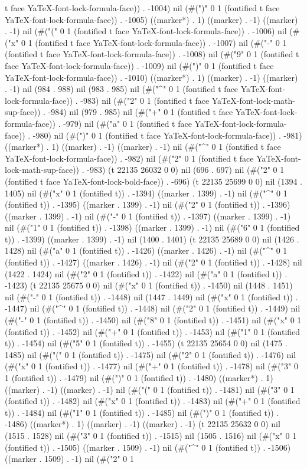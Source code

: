 t face YaTeX-font-lock-formula-face)) . -1004) nil (#(")" 0 1 (fontified t face YaTeX-font-lock-formula-face)) . -1005) ((marker*) . 1) ((marker) . -1) ((marker) . -1) nil (#("(" 0 1 (fontified t face YaTeX-font-lock-formula-face)) . -1006) nil (#("x" 0 1 (fontified t face YaTeX-font-lock-formula-face)) . -1007) nil (#("-" 0 1 (fontified t face YaTeX-font-lock-formula-face)) . -1008) nil (#("9" 0 1 (fontified t face YaTeX-font-lock-formula-face)) . -1009) nil (#(")" 0 1 (fontified t face YaTeX-font-lock-formula-face)) . -1010) ((marker*) . 1) ((marker) . -1) ((marker) . -1) nil (984 . 988) nil (983 . 985) nil (#("^" 0 1 (fontified t face YaTeX-font-lock-formula-face)) . -983) nil (#("2" 0 1 (fontified t face YaTeX-font-lock-math-sup-face)) . -984) nil (979 . 985) nil (#("+" 0 1 (fontified t face YaTeX-font-lock-formula-face)) . -979) nil (#("a" 0 1 (fontified t face YaTeX-font-lock-formula-face)) . -980) nil (#(")" 0 1 (fontified t face YaTeX-font-lock-formula-face)) . -981) ((marker*) . 1) ((marker) . -1) ((marker) . -1) nil (#("^" 0 1 (fontified t face YaTeX-font-lock-formula-face)) . -982) nil (#("2" 0 1 (fontified t face YaTeX-font-lock-math-sup-face)) . -983) (t 22135 26032 0 0) nil (696 . 697) nil (#("2" 0 1 (fontified t face YaTeX-font-lock-bold-face)) . -696) (t 22135 25699 0 0) nil (1394 . 1405) nil (#("x" 0 1 (fontified t)) . -1394) ((marker . 1399) . -1) nil (#("^" 0 1 (fontified t)) . -1395) ((marker . 1399) . -1) nil (#("2" 0 1 (fontified t)) . -1396) ((marker . 1399) . -1) nil (#("-" 0 1 (fontified t)) . -1397) ((marker . 1399) . -1) nil (#("1" 0 1 (fontified t)) . -1398) ((marker . 1399) . -1) nil (#("6" 0 1 (fontified t)) . -1399) ((marker . 1399) . -1) nil (1400 . 1401) (t 22135 25689 0 0) nil (1426 . 1428) nil (#("a" 0 1 (fontified t)) . -1426) ((marker . 1426) . -1) nil (#("^" 0 1 (fontified t)) . -1427) ((marker . 1426) . -1) nil (#("2" 0 1 (fontified t)) . -1428) nil (1422 . 1424) nil (#("2" 0 1 (fontified t)) . -1422) nil (#("a" 0 1 (fontified t)) . -1423) (t 22135 25675 0 0) nil (#("x" 0 1 (fontified t)) . -1450) nil (1448 . 1451) nil (#("-" 0 1 (fontified t)) . -1448) nil (1447 . 1449) nil (#("x" 0 1 (fontified t)) . -1447) nil (#("^" 0 1 (fontified t)) . -1448) nil (#("2" 0 1 (fontified t)) . -1449) nil (#("-" 0 1 (fontified t)) . -1450) nil (#("8" 0 1 (fontified t)) . -1451) nil (#("x" 0 1 (fontified t)) . -1452) nil (#("+" 0 1 (fontified t)) . -1453) nil (#("1" 0 1 (fontified t)) . -1454) nil (#("5" 0 1 (fontified t)) . -1455) (t 22135 25654 0 0) nil (1475 . 1485) nil (#("(" 0 1 (fontified t)) . -1475) nil (#("2" 0 1 (fontified t)) . -1476) nil (#("x" 0 1 (fontified t)) . -1477) nil (#("+" 0 1 (fontified t)) . -1478) nil (#("3" 0 1 (fontified t)) . -1479) nil (#(")" 0 1 (fontified t)) . -1480) ((marker*) . 1) ((marker) . -1) ((marker) . -1) nil (#("(" 0 1 (fontified t)) . -1481) nil (#("3" 0 1 (fontified t)) . -1482) nil (#("x" 0 1 (fontified t)) . -1483) nil (#("+" 0 1 (fontified t)) . -1484) nil (#("1" 0 1 (fontified t)) . -1485) nil (#(")" 0 1 (fontified t)) . -1486) ((marker*) . 1) ((marker) . -1) ((marker) . -1) (t 22135 25632 0 0) nil (1515 . 1528) nil (#("3" 0 1 (fontified t)) . -1515) nil (1505 . 1516) nil (#("x" 0 1 (fontified t)) . -1505) ((marker . 1509) . -1) nil (#("^" 0 1 (fontified t)) . -1506) ((marker . 1509) . -1) nil (#("2" 0 1 